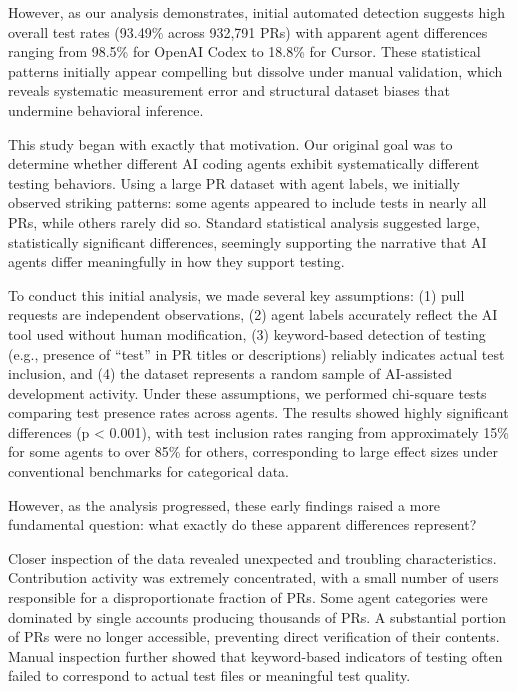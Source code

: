 \documentclass[conference]{IEEEtran}
\begin{document}
However, as our analysis demonstrates, initial automated detection suggests high overall test rates (93.49\% across 932,791 PRs) with apparent agent differences ranging from 98.5\% for OpenAI Codex to 18.8\% for Cursor. These statistical patterns initially appear compelling but dissolve under manual validation, which reveals systematic measurement error and structural dataset biases that undermine behavioral inference.

This study began with exactly that motivation. Our original goal was to determine whether different AI coding agents exhibit systematically different testing behaviors. Using a large PR dataset with agent labels, we initially observed striking patterns: some agents appeared to include tests in nearly all PRs, while others rarely did so. Standard statistical analysis suggested large, statistically significant differences, seemingly supporting the narrative that AI agents differ meaningfully in how they support testing.

To conduct this initial analysis, we made several key assumptions: (1) pull requests are independent observations, (2) agent labels accurately reflect the AI tool used without human modification, (3) keyword-based detection of testing (e.g., presence of ``test'' in PR titles or descriptions) reliably indicates actual test inclusion, and (4) the dataset represents a random sample of AI-assisted development activity. Under these assumptions, we performed chi-square tests comparing test presence rates across agents. The results showed highly significant differences (p < 0.001), with test inclusion rates ranging from approximately 15\% for some agents to over 85\% for others, corresponding to large effect sizes under conventional benchmarks for categorical data.

However, as the analysis progressed, these early findings raised a more fundamental question: what exactly do these apparent differences represent?

Closer inspection of the data revealed unexpected and troubling characteristics. Contribution activity was extremely concentrated, with a small number of users responsible for a disproportionate fraction of PRs. Some agent categories were dominated by single accounts producing thousands of PRs. A substantial portion of PRs were no longer accessible, preventing direct verification of their contents. Manual inspection further showed that keyword-based indicators of testing often failed to correspond to actual test files or meaningful test quality.
\end{document}
